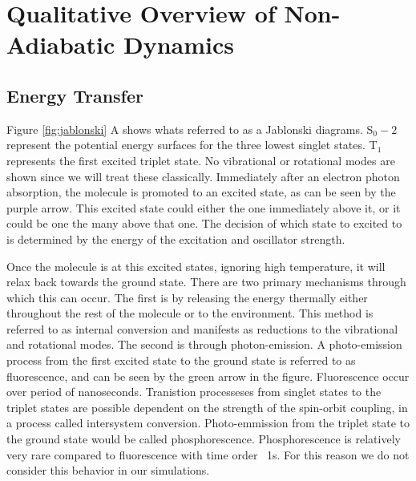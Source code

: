 \section{Qualitative Overview of Non-Adiabatic Dynamics}

\subsection{Energy Transfer}

\noindent
	  \begin{multiFigure} 
	    \label{fig:jablonski}
	  \end{multiFigure}
\bigskip

Figure \ref{fig:jablonski} A shows whats referred to as a Jablonski diagrams.
S\(_0-2\) represent the potential energy surfaces for the three lowest singlet states.
T\(_1\) represents the first excited triplet state.
No vibrational or rotational modes are shown since we will treat these classically.
Immediately after an electron photon absorption, the molecule is promoted to an excited state, as can be seen by the purple arrow.
This excited state could either the one immediately above it, or it could be one the many above that one.
The decision of which state to excited to is determined by the energy of the excitation and oscillator strength.

Once the molecule is at this excited states, ignoring high temperature, it will relax back towards the ground state.
There are two primary mechanisms through which this can occur.
The first is by releasing the energy thermally either throughout the rest of the molecule or to the environment. This method is referred to as internal conversion and manifests as reductions to the vibrational and rotational modes.
The second is through photon-emission.
A photo-emission process from the first excited state to the ground state is referred to as fluorescence, and can be seen by the green arrow in the figure.
Fluorescence occur over period of nanoseconds.
Tranistion processeses from singlet states to the triplet states are possible dependent on the strength of the spin-orbit coupling, in a process called intersystem conversion.
Photo-emmission from the triplet state to the ground state would be called phosphorescence.
Phosphorescence is relatively very rare compared to fluorescence with time order ~1s.
For this reason we do not consider this behavior in our simulations.

